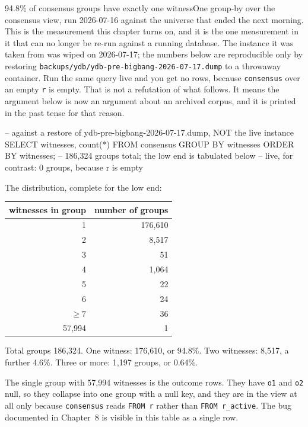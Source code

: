 \begin{Correspondence}{94.8\% of consensus groups have exactly one witness}{One group-by over the consensus view, run 2026-07-16 against the universe that ended the next morning.}
This is the measurement this chapter turns on, and it is the one measurement in it that can no longer be re-run against a running database. The instance it was taken from was wiped on 2026-07-17; the numbers below are reproducible only by restoring \texttt{backups/ydb/ydb-pre-bigbang-2026-07-17.dump} to a throwaway container. Run the same query live and you get no rows, because \texttt{consensus} over an empty \texttt{r} is empty. That is not a refutation of what follows. It means the argument below is now an argument about an archived corpus, and it is printed in the past tense for that reason.
\begin{Check}
-- against a restore of ydb-pre-bigbang-2026-07-17.dump, NOT the live instance
SELECT witnesses, count(*) FROM consensus GROUP BY witnesses ORDER BY witnesses;
    -- 186,324 groups total; the low end is tabulated below
    -- live, for contrast: 0 groups, because r is empty
\end{Check}
The distribution, complete for the low end:

\begin{center}
\begin{tabular}{rr}
\toprule
witnesses in group & number of groups \\
\midrule
1 & 176{,}610 \\
2 & 8{,}517 \\
3 & 51 \\
4 & 1{,}064 \\
5 & 22 \\
6 & 24 \\
$\geq 7$ & 36 \\
57{,}994 & 1 \\
\bottomrule
\end{tabular}
\end{center}

Total groups 186{,}324. One witness: 176{,}610, or 94.8\%. Two witnesses: 8{,}517, a further 4.6\%. Three or more: 1{,}197 groups, or 0.64\%.

The single group with 57{,}994 witnesses is the outcome rows. They have \texttt{o1} and \texttt{o2} null, so they collapse into one group with a null key, and they are in the view at all only because \texttt{consensus} reads \texttt{FROM r} rather than \texttt{FROM r\_active}. The bug documented in Chapter~8 is visible in this table as a single row.
\end{Correspondence}

